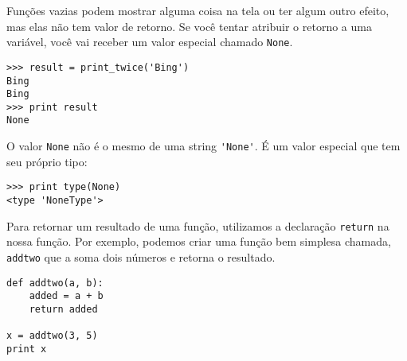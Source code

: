 

Funções vazias podem mostrar alguma coisa na tela ou ter algum outro efeito,
mas elas não tem valor de retorno. Se você tentar atribuir o retorno a uma
variável, você vai receber um valor especial chamado {\tt None}.


\beforeverb
\begin{verbatim}
>>> result = print_twice('Bing')
Bing
Bing
>>> print result
None
\end{verbatim}
\afterverb
%

%
O valor {\tt None} não é o mesmo de uma string \verb"'None'". É um valor
especial que tem seu próprio tipo:

\beforeverb
\begin{verbatim}
>>> print type(None)
<type 'NoneType'>
\end{verbatim}
\afterverb
%

%
Para retornar um resultado de uma função, utilizamos a declaração
{\tt return} na nossa função. Por exemplo, podemos criar uma função bem
simplesa chamada, {\tt addtwo} que a soma dois números e retorna o resultado.

\beforeverb
\begin{verbatim}
def addtwo(a, b):
    added = a + b
    return added

x = addtwo(3, 5)
print x
\end{verbatim}
\afterverb
%

